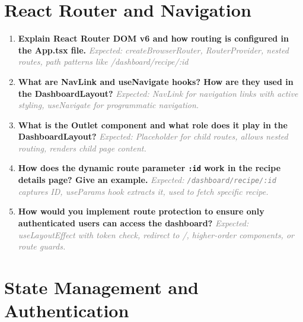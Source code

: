 \documentclass[12pt]{article}
\begin{document}
\section*{React Router and Navigation}

\begin{enumerate}[label=\textbf{\arabic*.}, itemsep=0.5cm, start=6]

\item \textbf{Explain React Router DOM v6 and how routing is configured in the App.tsx file.}
\newline
\textcolor{gray}{\textit{Expected: createBrowserRouter, RouterProvider, nested routes, path patterns like /dashboard/recipe/:id}}

\item \textbf{What are NavLink and useNavigate hooks? How are they used in the DashboardLayout?}
\newline
\textcolor{gray}{\textit{Expected: NavLink for navigation links with active styling, useNavigate for programmatic navigation.}}

\item \textbf{What is the Outlet component and what role does it play in the DashboardLayout?}
\newline
\textcolor{gray}{\textit{Expected: Placeholder for child routes, allows nested routing, renders child page content.}}

\item \textbf{How does the dynamic route parameter \texttt{:id} work in the recipe details page? Give an example.}
\newline
\textcolor{gray}{\textit{Expected: \texttt{/dashboard/recipe/:id} captures ID, useParams hook extracts it, used to fetch specific recipe.}}

\item \textbf{How would you implement route protection to ensure only authenticated users can access the dashboard?}
\newline
\textcolor{gray}{\textit{Expected: useLayoutEffect with token check, redirect to /, higher-order components, or route guards.}}

\end{enumerate}

\section*{State Management and Authentication}
\end{document}
